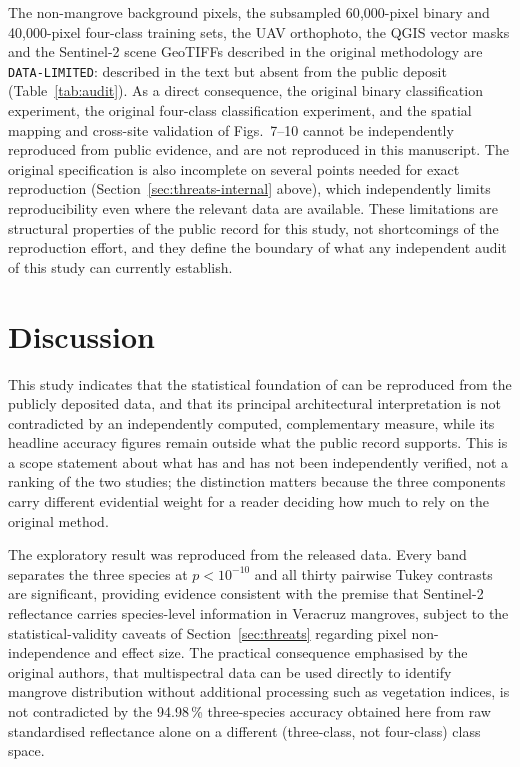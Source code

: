 \documentclass[10pt,twocolumn,a4paper]{article}
\newcommand{\evc}[1]{{\footnotesize\texttt{#1}}}
\begin{document}
The non-mangrove background pixels, the subsampled 60{,}000-pixel binary and 40{,}000-pixel
four-class training sets, the UAV orthophoto, the QGIS vector masks and the Sentinel-2 scene
GeoTIFFs described in the original methodology are \evc{DATA-LIMITED}: described in the text but
absent from the public deposit (Table~\ref{tab:audit}). As a direct consequence, the original
binary classification experiment, the original four-class classification experiment, and the
spatial mapping and cross-site validation of Figs.~7--10 cannot be independently reproduced from
public evidence, and are not reproduced in this manuscript. The original specification is also
incomplete on several points needed for exact reproduction
(Section~\ref{sec:threats-internal} above),
which independently limits reproducibility even where the relevant data are available. These
limitations are structural properties of the public record for this study, not shortcomings of the
reproduction effort, and they define the boundary of what any independent audit of this study can
currently establish.

\section{Discussion}
\label{sec:discussion}

This study indicates that the statistical foundation of \citet{monterrubio2025} can be reproduced
from the publicly deposited data, and that its principal architectural interpretation is not
contradicted by an independently computed, complementary measure, while its headline accuracy
figures remain outside what the public record supports. This is a scope statement about what has
and has not been independently verified, not a ranking of the two studies; the distinction matters
because the three components carry different evidential weight for a reader deciding how much to
rely on the original method.

The exploratory result was reproduced from the released data. Every band separates the three
species at $p<10^{-10}$ and all thirty pairwise Tukey contrasts are significant, providing evidence
consistent with the premise that Sentinel-2 reflectance carries species-level information in
Veracruz mangroves, subject to the statistical-validity caveats of Section~\ref{sec:threats}
regarding pixel non-independence and effect size. The practical consequence emphasised by the
original authors, that multispectral data can be used directly to identify mangrove distribution
without additional processing such as vegetation indices, is not contradicted by the 94.98\,\%
three-species accuracy obtained here from raw standardised reflectance alone on a different
(three-class, not four-class) class space.
\end{document}
